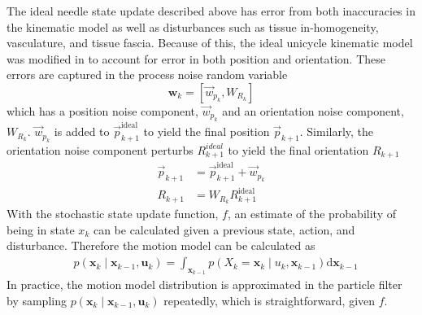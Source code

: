 \documentclass[journal,transmag]{IEEEtran}
\newcommand{\bvar}[2]{\mathbf{#1}_{#2}}
\newcommand{\motion}[1][k]{p(\mathbf{x}_{#1} \mid \mathbf{x}_{#1-1},\mathbf{u}_{#1})}
\begin{document}
The ideal needle state update described above has error from both inaccuracies in the kinematic model as well as disturbances such as tissue in-homogeneity, vasculature, and tissue fascia.  Because of this, the ideal unicycle kinematic model was modified in \cite{adebar2014recursive} to account for error in both position and orientation.  These errors are captured in the process noise random variable 
\begin{equation*}
\bvar{w}{k} = \left[\vec{w}_{p_k}, W_{R_k}\right]
\end{equation*}  
which has a position noise component, $\vec{w}_{p_k}$ and an orientation noise component, $W_{R_k}$.  $\vec{w}_{p_k}$ is added to $\vec{p}^{\text{ideal}}_{k+1}$ to yield the final position $\vec{p}_{k+1}$.
Similarly, the orientation noise component perturbs $R^{ideal}_{k+1}$ to yield the final orientation $R_{k+1}$
\begin{align*}
\vec{p}_{k+1} &= \vec{p}^{\text{ideal}}_{k+1}+\vec{w}_{p_k} \\
R_{k+1} &= W_{R_k}R^{\text{ideal}}_{k+1}
\end{align*}
With the stochastic state update function, $f$, an estimate of the probability of being in state $x_k$ can be calculated given a previous state, action, and disturbance.  Therefore the motion model can be calculated as 
\begin{align*}
& p(\bvar{x}{k} \mid \bvar{x}{k-1},\bvar{u}{k}) = \int_{\bvar{x}{k-1}} p(X_k = \bvar{x}{k} \mid u_k, \bvar{x}{k-1}) \mathrm{d}\bvar{x}{k-1}
\end{align*}
In practice, the motion model distribution is approximated in the particle filter by sampling $\motion$ repeatedly, which is straightforward, given $f$.
\end{document}
